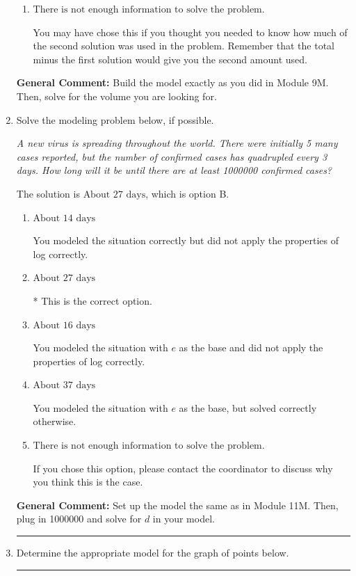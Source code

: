 \documentclass{extbook}[14pt]
\newcommand{\litem}[1]{\item #1

\rule{\textwidth}{0.4pt}}
\begin{document}
\begin{enumerate}
{\begin{enumerate}[label=\Alph*.]
This is the concentration of 17 percent solution.
\item \( \text{There is not enough information to solve the problem.} \)

You may have chose this if you thought you needed to know how much of the second solution was used in the problem. Remember that the total minus the first solution would give you the second amount used.
\end{enumerate}

\textbf{General Comment:} Build the model exactly as you did in Module 9M. Then, solve for the volume you are looking for.
}
\litem{
Solve the modeling problem below, if possible.

\begin{center}
    \textit{ A new virus is spreading throughout the world. There were initially 5 many cases reported, but the number of confirmed cases has quadrupled every 3 days. How long will it be until there are at least 1000000 confirmed cases? }
\end{center}


The solution is \( \text{About } 27 \text{ days} \), which is option B.\begin{enumerate}[label=\Alph*.]
\item \( \text{About } 14 \text{ days} \)

You modeled the situation correctly but did not apply the properties of log correctly.
\item \( \text{About } 27 \text{ days} \)

* This is the correct option.
\item \( \text{About } 16 \text{ days} \)

You modeled the situation with $e$ as the base and did not apply the properties of log correctly.
\item \( \text{About } 37 \text{ days} \)

You modeled the situation with $e$ as the base, but solved correctly otherwise.
\item \( \text{There is not enough information to solve the problem.} \)

If you chose this option, please contact the coordinator to discuss why you think this is the case.
\end{enumerate}

\textbf{General Comment:} Set up the model the same as in Module 11M. Then, plug in 1000000 and solve for $d$ in your model.
}
\litem{
Determine the appropriate model for the graph of points below.

}
\end{enumerate}
\end{document}
